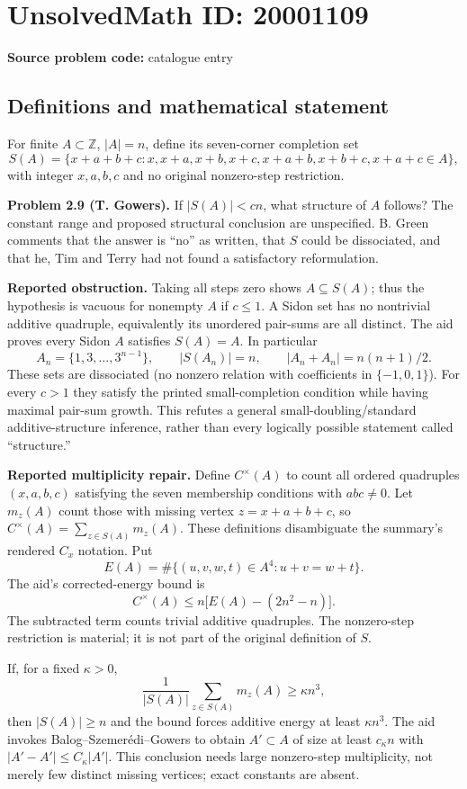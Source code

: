 \documentclass[11pt]{article}
\newcommand{\Z}{\mathbb{Z}}
\begin{document}
\section*{UnsolvedMath ID: 20001109}
\textbf{Source problem code:} catalogue entry
\subsection{Definitions and mathematical statement}
For finite $A\subset\Z$, $|A|=n$, define its seven-corner completion set
\[
 S(A)=\{x+a+b+c:x,x+a,x+b,x+c,x+a+b,x+b+c,x+a+c\in A\},
\]
with integer $x,a,b,c$ and no original nonzero-step restriction.

\textbf{Problem 2.9 (T. Gowers).} If $|S(A)|<cn$, what structure of $A$ follows? The constant range and proposed structural conclusion are unspecified. B. Green comments that the answer is ``no'' as written, that $S$ could be dissociated, and that he, Tim and Terry had not found a satisfactory reformulation.

\textbf{Reported obstruction.} Taking all steps zero shows $A\subseteq S(A)$; thus the hypothesis is vacuous for nonempty $A$ if $c\leq1$. A Sidon set has no nontrivial additive quadruple, equivalently its unordered pair-sums are all distinct. The aid proves every Sidon $A$ satisfies $S(A)=A$. In particular
\[
 A_n=\{1,3,\ldots,3^{n-1}\},\qquad |S(A_n)|=n,\qquad
 |A_n+A_n|=n(n+1)/2.
\]
These sets are dissociated (no nonzero relation with coefficients in $\{-1,0,1\}$). For every $c>1$ they satisfy the printed small-completion condition while having maximal pair-sum growth. This refutes a general small-doubling/standard additive-structure inference, rather than every logically possible statement called ``structure.''

\textbf{Reported multiplicity repair.} Define $C^{\times}(A)$ to count all ordered quadruples $(x,a,b,c)$ satisfying the seven membership conditions with $abc\ne0$. Let $m_z(A)$ count those with missing vertex $z=x+a+b+c$, so $C^{\times}(A)=\sum_{z\in S(A)}m_z(A)$. These definitions disambiguate the summary's rendered $C_x$ notation. Put
\[
 E(A)=\#\{(u,v,w,t)\in A^4:u+v=w+t\}.
\]
The aid's corrected-energy bound is
\[
 C^{\times}(A)\leq n\big[E(A)-(2n^2-n)\big].
\]
The subtracted term counts trivial additive quadruples. The nonzero-step restriction is material; it is not part of the original definition of $S$.

If, for a fixed $\kappa>0$,
\[
 \frac1{|S(A)|}\sum_{z\in S(A)}m_z(A)\geq\kappa n^3,
\]
then $|S(A)|\geq n$ and the bound forces additive energy at least $\kappa n^3$. The aid invokes Balog--Szemer\'edi--Gowers to obtain $A'\subset A$ of size at least $c_\kappa n$ with $|A'-A'|\leq C_\kappa|A'|$. This conclusion needs large nonzero-step multiplicity, not merely few distinct missing vertices; exact constants are absent.
\end{document}
